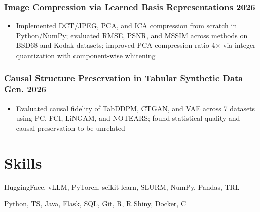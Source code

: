 \documentclass[10pt]{article} %
\begin{document}
\subsubsection{Image Compression via Learned Basis Representations \hfill 2026}
\begin{itemize}
	\item Implemented DCT/JPEG, PCA, and ICA compression from scratch in Python/NumPy; evaluated RMSE, PSNR, and MSSIM across methods on BSD68 and Kodak datasets; improved PCA compression ratio 4$\times$ via integer quantization with component-wise whitening
\end{itemize}
\vspace{-7pt}
\subsubsection{Causal Structure Preservation in Tabular Synthetic Data Gen. \hfill 2026}
\begin{itemize}
	\item Evaluated causal fidelity of TabDDPM, CTGAN, and VAE across 7 datasets using PC, FCI, LiNGAM, and NOTEARS; found statistical quality and causal preservation to be unrelated
\end{itemize}

\section{Skills}
\begin{description}[itemsep=0pt]
	\item[ML/AI] HuggingFace, vLLM, PyTorch, scikit-learn, SLURM, NumPy, Pandas, TRL
	\item[Software] Python, TS, Java, Flask, SQL, Git, R, R Shiny, Docker, C
\end{description}
\end{document}
